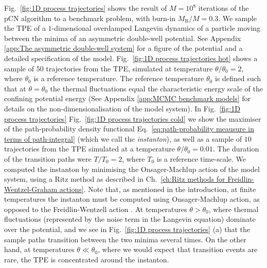 Fig.~\ref{fig:1D process trajectories} shows the result of $M=10^8$ iterations of the pCN algorithm to a benchmark problem, with burn-in $M_\text{B}/M = 0.3$. We sample the TPE of a $1$-dimensional overdamped Langevin dynamics of a particle moving between the minima of an asymmetric double-well potential. See Appendix \ref{app:The asymmetric double-well system} for a figure of the potential and a detailed specification of the model. Fig.~\ref{fig:1D process trajectories hot} shows a sample of $50$ trajectories from the TPE, simulated at temperature $\theta/\theta_0 = 2$, where $\theta_0$ is a reference temperature. The reference temperature $\theta_0$ is defined such that at $\theta = \theta_0$ the thermal fluctuations equal the characteristic energy scale of the confining potential energy (See Appendix \ref{app:MCMC benchmark models} for details on the non-dimensionalisation of the model system). In Fig.~\ref{fig:1D process trajectories} Fig.~\ref{fig:1D process trajectories cold} we show the maximiser of the path-probability density functional Eq.~\ref{eq:path-probability meausure in terms of path-integral} (which we call the \textit{instanton}), as well as a sample of $10$ trajectories from the TPE simulated at a temperature $\theta/\theta_0 = 0.01$. The duration of the transition paths were $T /T_0 = 2$, where $T_0$ is a reference time-scale. We computed the instanton by minimising the Onsager-Machlup action of the model system, using a Ritz method as described in Ch.~\ref{ch:Ritz methods for Freidlin-Wentzel-Graham actions}. Note that, as mentioned in the introduction, at finite temperatures the instanton must be computed using Onsager-Machlup action, as opposed to the Freidlin-Wentzell action \citep{gladrowExperimentalMeasurementRelative2021, adibStochasticActionsDiffusive2008}. At temperatures $\theta > \theta_0$, where thermal fluctuations (represented by the noise term in the Langevin equation) dominate over the potential, and we see in Fig.~\ref{fig:1D process trajectories} (a) that the sample paths transition between the two minima several times. On the other hand, at temperatures $\theta \ll \theta_0$, where we would expect that transition events are rare, the TPE is concentrated around the instanton.


